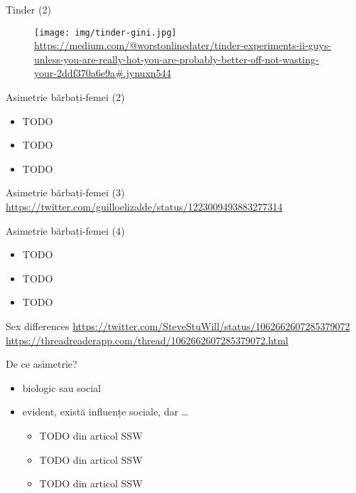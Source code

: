 \documentclass{simple}
\begin{document}
\begin{frame}{Tinder (2)}
  \begin{figure}[!htbp]
    \centering
    \texttt{[image: img/tinder-gini.jpg]} \\
    \tiny{\url{https://medium.com/@worstonlinedater/tinder-experiments-ii-guys-unless-you-are-really-hot-you-are-probably-better-off-not-wasting-your-2ddf370a6e9a\#.jynuxn544}}
  \end{figure}
\end{frame}

\begin{frame}{Asimetrie bărbați-femei (2)}
  \begin{itemize}
    \item TODO
    \item TODO
    \item TODO
  \end{itemize}
\end{frame}

\begin{frame}{Asimetrie bărbați-femei (3)}
  \url{https://twitter.com/guilloelizalde/status/1223009493883277314}
\end{frame}

\begin{frame}{Asimetrie bărbați-femei (4)}
  \begin{itemize}
    \item TODO
    \item TODO
    \item TODO
  \end{itemize}
\end{frame}

\begin{frame}{Sex differences}
  \url{https://twitter.com/SteveStuWill/status/1062662607285379072}
  \url{https://threadreaderapp.com/thread/1062662607285379072.html}
\end{frame}

\begin{frame}{De ce asimetrie?}
  \begin{itemize}
    \item biologic sau social
    \item evident, există influențe sociale, dar \ldots{}
      \begin{itemize}
        \item TODO din articol SSW
        \item TODO din articol SSW
        \item TODO din articol SSW
      \end{itemize}
  \end{itemize}
\end{frame}
\end{document}
